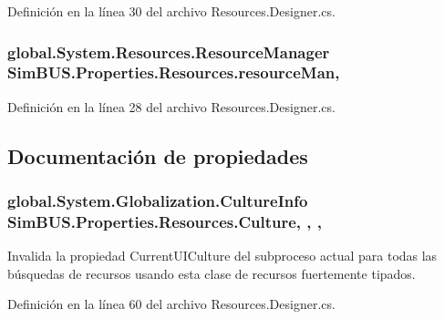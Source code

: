 Definición en la línea 30 del archivo Resources.\-Designer.\-cs.

\subsubsection[{resource\-Man}]{\setlength{\rightskip}{0pt plus 5cm}global.\-System.\-Resources.\-Resource\-Manager Sim\-B\-U\-S.\-Properties.\-Resources.\-resource\-Man\hspace{0.3cm}{\ttfamily [static]}, {\ttfamily [private]}}\label{class_sim_b_u_s_1_1_properties_1_1_resources_a359facab1a8e99bca2bd8a4f3a034f81}


Definición en la línea 28 del archivo Resources.\-Designer.\-cs.



\subsection{Documentación de propiedades}
\subsubsection[{Culture}]{\setlength{\rightskip}{0pt plus 5cm}global.\-System.\-Globalization.\-Culture\-Info Sim\-B\-U\-S.\-Properties.\-Resources.\-Culture\hspace{0.3cm}{\ttfamily [static]}, {\ttfamily [get]}, {\ttfamily [set]}, {\ttfamily [package]}}\label{class_sim_b_u_s_1_1_properties_1_1_resources_a6d09b09ccff826f120e3b0317273e1a8}


Invalida la propiedad Current\-U\-I\-Culture del subproceso actual para todas las búsquedas de recursos usando esta clase de recursos fuertemente tipados. 



Definición en la línea 60 del archivo Resources.\-Designer.\-cs.

